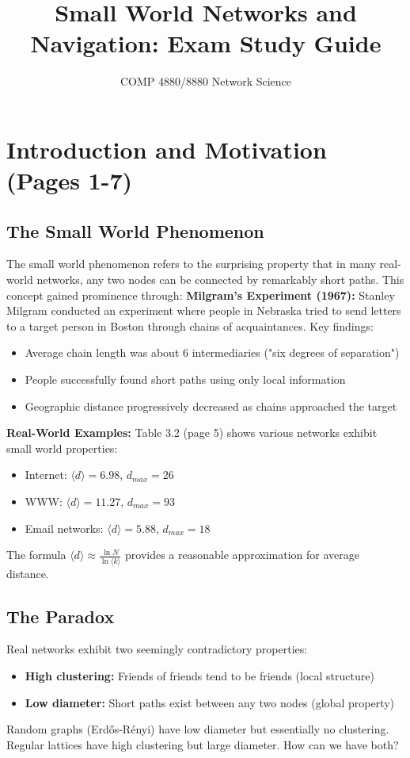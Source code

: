 \documentclass[11pt,a4paper]{article}
\title{Small World Networks and Navigation: Exam Study Guide}
\author{COMP 4880/8880 Network Science}
\date{}
\theoremstyle{definition}
\begin{document}
\maketitle
\section{Introduction and Motivation (Pages 1-7)}
\subsection{The Small World Phenomenon}
The small world phenomenon refers to the surprising property that in many real-world networks, any two nodes can be connected by remarkably short paths. This concept gained prominence through:
\textbf{Milgram's Experiment (1967):} Stanley Milgram conducted an experiment where people in Nebraska tried to send letters to a target person in Boston through chains of acquaintances. Key findings:
\begin{itemize}
\item Average chain length was about 6 intermediaries ("six degrees of separation")
\item People successfully found short paths using only local information
\item Geographic distance progressively decreased as chains approached the target
\end{itemize}
\textbf{Real-World Examples:} Table 3.2 (page 5) shows various networks exhibit small world properties:
\begin{itemize}
\item Internet: $\langle d \rangle = 6.98$, $d_{max} = 26$
\item WWW: $\langle d \rangle = 11.27$, $d_{max} = 93$
\item Email networks: $\langle d \rangle = 5.88$, $d_{max} = 18$
\end{itemize}
The formula $\langle d \rangle \approx \frac{\ln N}{\ln\langle k \rangle}$ provides a reasonable approximation for average distance.
\subsection{The Paradox}
Real networks exhibit two seemingly contradictory properties:
\begin{itemize}
\item \textbf{High clustering:} Friends of friends tend to be friends (local structure)
\item \textbf{Low diameter:} Short paths exist between any two nodes (global property)
\end{itemize}
Random graphs (Erdős-Rényi) have low diameter but essentially no clustering. Regular lattices have high clustering but large diameter. How can we have both?
\end{document}
